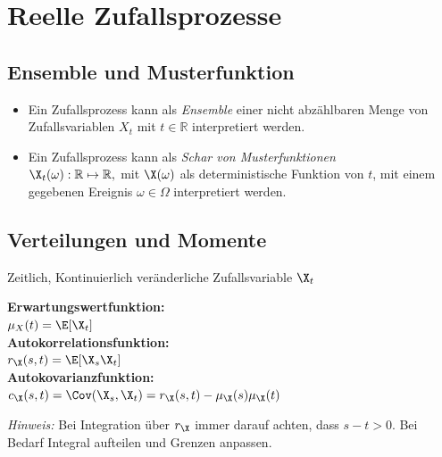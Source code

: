 \documentclass[german,color,6pt]{latex4ei/latex4ei_sheet}
\begin{document}
\section{Reelle Zufallsprozesse}
\begin{sectionbox}
	\subsection{Ensemble und Musterfunktion}
	\begin{itemize}
		\item Ein Zufallsprozess kann als \emph{Ensemble} einer nicht abzählbaren Menge von Zufallsvariablen $X_{t}$ mit $t \in \mathbb{R}$ interpretiert werden.
		\item Ein Zufallsprozess kann als \emph{Schar von Musterfunktionen} \\ $\X_{t}(\omega) : \mathbb{R} \mapsto \mathbb{R},$
		 mit $\X(\omega)$ als deterministische Funktion von $t$, mit einem gegebenen Ereignis $\omega \in \Omega$ interpretiert werden.
	\end{itemize}
\end{sectionbox}
\begin{sectionbox}
	\subsection{Verteilungen und Momente}
	Zeitlich, Kontinuierlich veränderliche Zufallsvariable $\X_t$\\
	
	\begin{emphbox}
		\raggedright
		\textbf{Erwartungswertfunktion:} \\ $\mu_X (t) = \E[\X_t]$ \\[0.5em]
		\textbf{Autokorrelationsfunktion:} \\ $r_{\X}(s,t) = \E[\X_s \X_t]$\\[0.5em]
		\textbf{Autokovarianzfunktion:} \\ $c_{\X}(s,t) = \Cov(\X_s,\X_t) = r_{\X}(s,t) - \mu_{\X}(s)\mu_{\X}(t)$
	\end{emphbox}	
	\emph{Hinweis:} Bei Integration über $r_{\X}$ immer darauf achten, dass $s - t > 0$. Bei Bedarf Integral aufteilen und Grenzen anpassen.
\end{sectionbox}
\end{document}
